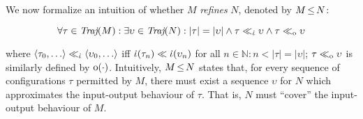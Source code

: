 We now formalize an intuition of whether $M$ \textit{refines} $N$, denoted by $M \operatorname{\leq} N$:


\begin{equation*}
\forall \tau \in \operatorname{\textit{Traj}}(M) : \exists \upsilon \in \operatorname{\textit{Traj}}(N) : | \tau | = | \upsilon | \wedge \tau \ll_{\dot{\iota}} \upsilon \wedge \tau \ll_{\mathrm{o}} \upsilon
\end{equation*}

\noindent where $\langle \tau_{0}, \ldots \rangle \ll_{\dot{\iota}} \langle \upsilon_{0}, \ldots \rangle$ iff $\dot{\iota}(\tau_{n}) \ll \dot{\iota}(\upsilon_{n})$ for all $n \in \mathbb{N} : n < | \tau | = | \upsilon |$; $\tau \ll_{\mathrm{o}} \upsilon$ is similarly defined by $\mathrm{o}(\cdot)$. Intuitively, $M \operatorname{\leq} N$ states that, for every sequence of configurations $\tau$ permitted by $M$, there must exist a sequence $\upsilon$ for $N$ which approximates the input-output behaviour of $\tau$. That is, $N$ must ``cover'' the input-output behaviour of $M$.


